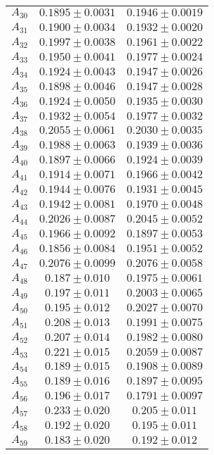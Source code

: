\begin{tabular}{c|c|c}
$A_30$ & $0.1895\pm0.0031$ & $0.1946\pm0.0019$ \\
$A_31$ & $0.1900\pm0.0034$ & $0.1932\pm0.0020$ \\
$A_32$ & $0.1997\pm0.0038$ & $0.1961\pm0.0022$ \\
$A_33$ & $0.1950\pm0.0041$ & $0.1977\pm0.0024$ \\
$A_34$ & $0.1924\pm0.0043$ & $0.1947\pm0.0026$ \\
$A_35$ & $0.1898\pm0.0046$ & $0.1947\pm0.0028$ \\
$A_36$ & $0.1924\pm0.0050$ & $0.1935\pm0.0030$ \\
$A_37$ & $0.1932\pm0.0054$ & $0.1977\pm0.0032$ \\
$A_38$ & $0.2055\pm0.0061$ & $0.2030\pm0.0035$ \\
$A_39$ & $0.1988\pm0.0063$ & $0.1939\pm0.0036$ \\
$A_40$ & $0.1897\pm0.0066$ & $0.1924\pm0.0039$ \\
$A_41$ & $0.1914\pm0.0071$ & $0.1966\pm0.0042$ \\
$A_42$ & $0.1944\pm0.0076$ & $0.1931\pm0.0045$ \\
$A_43$ & $0.1942\pm0.0081$ & $0.1970\pm0.0048$ \\
$A_44$ & $0.2026\pm0.0087$ & $0.2045\pm0.0052$ \\
$A_45$ & $0.1966\pm0.0092$ & $0.1897\pm0.0053$ \\
$A_46$ & $0.1856\pm0.0084$ & $0.1951\pm0.0052$ \\
$A_47$ & $0.2076\pm0.0099$ & $0.2076\pm0.0058$ \\
$A_48$ & $0.187\pm0.010$ & $0.1975\pm0.0061$ \\
$A_49$ & $0.197\pm0.011$ & $0.2003\pm0.0065$ \\
$A_50$ & $0.195\pm0.012$ & $0.2027\pm0.0070$ \\
$A_51$ & $0.208\pm0.013$ & $0.1991\pm0.0075$ \\
$A_52$ & $0.207\pm0.014$ & $0.1982\pm0.0080$ \\
$A_53$ & $0.221\pm0.015$ & $0.2059\pm0.0087$ \\
$A_54$ & $0.189\pm0.015$ & $0.1908\pm0.0089$ \\
$A_55$ & $0.189\pm0.016$ & $0.1897\pm0.0095$ \\
$A_56$ & $0.196\pm0.017$ & $0.1791\pm0.0097$ \\
$A_57$ & $0.233\pm0.020$ & $0.205\pm0.011$ \\
$A_58$ & $0.192\pm0.020$ & $0.195\pm0.011$ \\
$A_59$ & $0.183\pm0.020$ & $0.192\pm0.012$ \\

\end{tabular}
